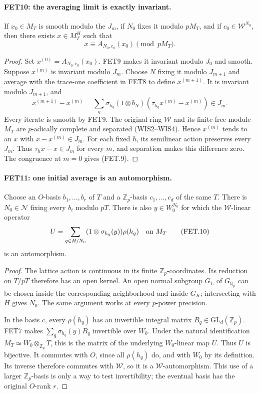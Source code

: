 \documentclass[11pt,a4paper]{article}
\numberwithin{equation}{section}
\theoremstyle{remark}\newtheorem{remark}[theorem]{Remark}
\begin{document}
\paragraph{FET10: the averaging limit is exactly invariant.}
\label{claim:FET10}
If $x_0\in M_T$ is smooth modulo the $J_m$, if $N_0$ fixes
it modulo $pM_T$, and if $c_0\in\mathcal W^{N_0}$, then there
exists $x\in M_T^H$ such that
\[
                   x\equiv A_{N_0,c_0}(x_0)\pmod {pM_T}.
                                                               \tag{FET.9}
\]

\begin{proof}
Set $x^{(0)}=A_{N_0,c_0}(x_0)$. FET9 makes it invariant
modulo $J_0$ and smooth. Suppose $x^{(m)}$ is invariant modulo
$J_m$. Choose $N$ fixing it modulo $J_{m+1}$ and average
with the trace-one coefficient in FET8 to define $x^{(m+1)}$.
It is invariant modulo $J_{m+1}$, and
\[
 x^{(m+1)}-x^{(m)}
 =\sum_q\sigma_{h_q}(1\otimes b_N)
                       (\tau_{h_q}x^{(m)}-x^{(m)})\in J_m.
\]
Every iterate is smooth by FET9. The original ring $\mathcal W$
and its finite free module $M_T$ are $p$-adically complete and
separated (WIS2--WIS4). Hence $x^{(m)}$ tends to an $x$ with
$x-x^{(m)}\in J_m$. For each fixed $h$, its semilinear action
preserves every $J_m$. Thus $\tau_hx-x\in J_m$ for every $m$,
and separation makes this difference zero. The congruence at
$m=0$ gives (FET.9).
\end{proof}

\paragraph{FET11: one initial average is an automorphism.}
\label{claim:FET11}
Choose an $O$-basis $b_1,\ldots,b_r$ of $T$ and a
$\mathbb Z_p$-basis $c_1,\ldots,c_d$ of the same $T$.
There is $N_0\in\mathcal N$ fixing every $b_i$ modulo $pT$.
There is also $y\in W_0^{N_0}$ for which the $\mathcal W$-linear
operator
\[
 U=\sum_{q\in H/N_0}(1\otimes\sigma_{h_q}(y))\rho(h_q)
                         \quad\hbox{on }M_T               \tag{FET.10}
\]
is an automorphism.

\begin{proof}
The lattice action is continuous in its finite
$\mathbb Z_p$-coordinates. Its reduction on $T/pT$ therefore
has an open kernel. An open normal subgroup $G_L$ of
$G_{\mathbb Q_p}$ can be chosen inside the corresponding
neighborhood and inside $G_K$; intersecting with $H$ gives
$N_0$. The same argument works at every $p$-power precision.

In the basis $c$, every $\rho(h_q)$ has an invertible integral
matrix $B_q\in\mathrm{GL}_d(\mathbb Z_p)$. FET7 makes
$\sum_q\sigma_{h_q}(y)B_q$ invertible over $W_0$.
Under the natural identification
$M_T\simeq W_0\otimes_{\mathbb Z_p}T$, this is the matrix of
the underlying $W_0$-linear map $U$. Thus $U$ is bijective.
It commutes with $O$, since all $\rho(h_q)$ do, and with
$W_0$ by its definition. Its inverse therefore commutes with
$\mathcal W$, so it is a $\mathcal W$-automorphism.
This use of a larger $\mathbb Z_p$-basis is only a way to test
invertibility; the eventual basis has the original $O$-rank $r$.
\end{proof}
\end{document}
